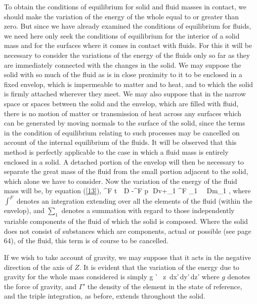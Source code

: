 \documentclass[12pt]{article}
\begin{document}
To obtain the conditions of equilibrium for solid and fluid masses in contact, we should make the variation of the energy of the whole equal to or greater than zero. But since we have already examined the conditions of equilibrium for fluids, we need here only seek the conditions of equilibrium for the interior of a solid mass and for the surfaces where it comes in contact with fluids. For this it will be necessary to consider the variations of the energy of the fluids only so far as they are immediately connected with the changes in the solid. We may suppose the solid with so much of the fluid as is in close proximity to it to be enclosed in a fixed envelop, which is impermeable to matter and to heat, and to which the solid is firmly attached wherever they meet. We may also suppose that in the narrow space or spaces between the solid and the envelop, which are filled with fluid, there is no motion of matter or transmission of heat across any surfaces which can be generated by moving normals to the surface of the solid, since the terms in the condition of equilibrium relating to such processes may be cancelled on account of the internal equilibrium of the fluids. It will be observed that this method is perfectly applicable to the case in which a fluid mass is entirely enclosed in a solid. A detached portion of the envelop will then be necessary to separate the great mass of the fluid from the small portion adjacent to the solid, which alone we have to consider. Now the variation of the energy of the fluid mass will be, by equation (\ref{13}),
\eqs \int^F t \, \delta \,D \eta -\int^F p \,\delta \,Dv+\sum_1 \int^F \mu_1 \, \delta \, Dm_1 , \label{358}\eqe
where $\int^F$ denotes an integration extending over all the elements of the fluid (within the envelop), and $\sum_1$ denotes a summation with regard to those independently variable components of the fluid of which the solid is composed. Where the solid does not consist of substances which are components, actual or possible (see page 64), of the fluid, this term is of course to be cancelled.


If we wish to take account of gravity, we may suppose that it acts in the negative direction of the axis of $Z$. It is evident that the variation of the energy due to gravity for the whole mass considered is simply
\eqs \int \int \int g \Gamma' \, \delta z \,dx'\,dy'\,dz' \label{359}\eqe
where $g$ denotes the force of gravity, and $\Gamma'$ the density of the element in the state of reference, and the triple integration, as before, extends throughout the solid.
\end{document}
